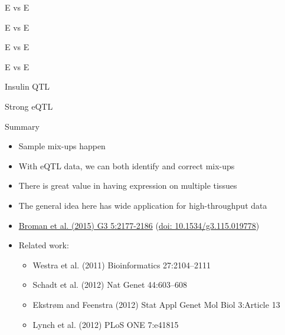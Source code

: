 \documentclass[12pt,t]{beamer}
\begin{document}
\begin{frame}[c]{E vs E}
\note{}
\end{frame}


\begin{frame}[c]{E vs E}
\note{}
\end{frame}


\begin{frame}[c]{E vs E}
\note{}
\end{frame}


\begin{frame}[c]{E vs E}
\note{}
\end{frame}

\begin{frame}[c]{Insulin QTL}
\note{}
\end{frame}


\begin{frame}[c]{Strong eQTL}
\note{}
\end{frame}


\begin{frame}[c]{Summary}


\small
\begin{itemize}
\itemsep3pt

\item Sample mix-ups happen


\item With eQTL data, we can both identify and {\hilit correct} mix-ups

\item There is great value in having expression on multiple tissues

\item The general idea here has wide application for high-throughput data

\item \href{https://www.ncbi.nlm.nih.gov/pubmed/26290572}{Broman et al. (2015) G3 5:2177-2186}
(\href{http://doi.org/10.1534/g3.115.019778}{doi: 10.1534/g3.115.019778})

\item Related work:

\begin{itemize}
\item Westra et al. (2011) Bioinformatics 27:2104--2111
\item Schadt et al. (2012) Nat Genet 44:603--608
\item Ekstr{\o}m and Feenstra (2012) Stat Appl Genet Mol Biol
  3:Article 13
\item Lynch et al. (2012) PLoS ONE 7:e41815
\end{itemize}

\end{itemize}
\note{}
\end{frame}
\end{document}

